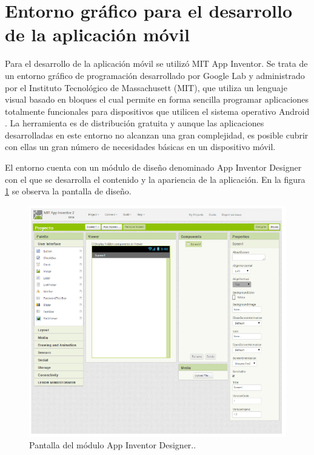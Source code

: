 %

\section{Entorno gráfico para el desarrollo de la aplicación móvil}

Para el desarrollo de la aplicación móvil se utilizó MIT App Inventor. Se trata de un entorno gráfico de programación desarrollado por Google Lab y administrado por el Instituto Tecnológico de Massachusett (MIT)\citep{MIT}, que utiliza un lenguaje visual basado en bloques el cual permite en forma sencilla programar aplicaciones totalmente funcionales para dispositivos que utilicen el sistema operativo Android \citep{android}.
La herramienta es de distribución gratuita y aunque las aplicaciones desarrolladas  en este entorno no alcanzan una gran complejidad, es posible cubrir con ellas un gran número de necesidades básicas en un dispositivo móvil.

El entorno cuenta con un módulo de diseño denominado App Inventor Designer con el que se desarrolla el contenido y la apariencia de la aplicación. En la figura \ref{fig:mitappdes} se observa la pantalla de diseño.

\begin{figure}[h]
	\centering
	\includegraphics[width=12cm]{./Figures/appinventordesigner.PNG}
	\caption{Pantalla del módulo App Inventor Designer\protect\footnotemark..}
	\label{fig:mitappdes}
\end{figure}


